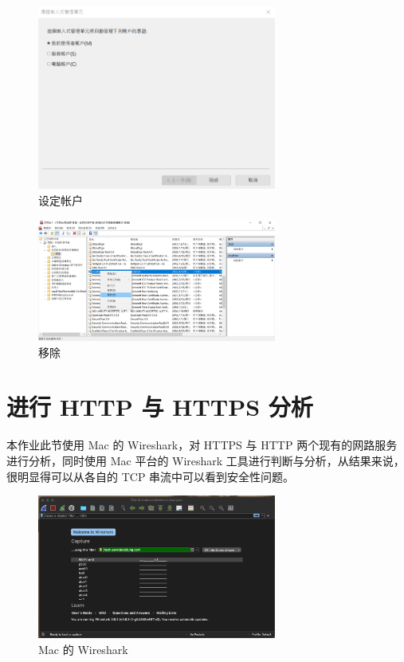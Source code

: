\begin{figure}[htb]
\centering 
\includegraphics[width=0.70\textwidth]{img/ch1s3m4.png} 
\caption{设定帐户}
\label{Test}
\end{figure}

\begin{figure}[htb]
\centering 
\includegraphics[width=0.70\textwidth]{img/ch1s3m5.png} 
\caption{移除}
\label{Test}
\end{figure}

\section{进行 HTTP 与 HTTPS 分析}

本作业此节使用 Mac 的 Wireshark，对 HTTPS 与 HTTP 两个现有的网路服务进行分析，同时使用 Mac 平台的 Wireshark 工具进行判断与分析，从结果来说，很明显得可以从各自的 TCP 串流中可以看到安全性问题。

\begin{figure}[htb]
\centering 
\includegraphics[width=0.70\textwidth]{img/ch1s4m1.png} 
\caption{Mac 的 Wireshark}
\label{Test}
\end{figure}

